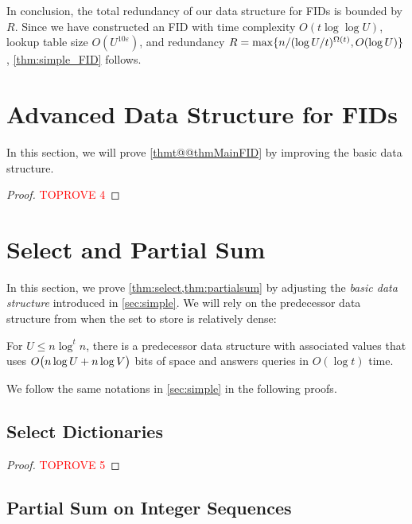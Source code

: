 \documentclass{article}
\theoremstyle{plain}
\theoremstyle{definition}  \newtheorem{definition}[theorem]{Definition}
\DeclarePairedDelimiter{\bk}{(}{)}
\DeclarePairedDelimiter{\BK}{\{}{\}}
\newcommand{\eps}{\varepsilon}
\begin{document}
\smallskip

In conclusion, the total redundancy of our data structure for FIDs is bounded by $R$. Since we have constructed an FID with time complexity $O(t\log \log U)$, lookup table size $O(U^{10 \eps})$, and redundancy $R = \max \BK{n/(\log U/t)^{\Omega(t)}, O(\log U)}$, \cref{thm:simple_FID} follows.
 
\section{Advanced Data Structure for FIDs}
\label{sec:advanced}

In this section, we will prove \cref{thmt@@thmMainFID} by improving the basic data structure. 
\thmMainFID*

\begin{proof}\textcolor{red}{TOPROVE 4}\end{proof}
 
\section{Select and Partial Sum}
\label{sec:select}

In this section, we prove \cref{thm:select,thm:partialsum} by adjusting the \emph{basic data structure} introduced in \cref{sec:simple}. We will rely on the predecessor data structure from \cite{patrascu2006timespace} when the set to store is relatively dense:

\begin{lemma}
  \label{lm:pred-dense}
  For $U \le n \log^{t} n$, there is a predecessor data structure with associated values that uses $O\bk[\big]{n \log U + n \log V}$ bits of space and answers queries in $O(\log t)$ time.
\end{lemma}

We follow the same notations in \cref{sec:simple} in the following proofs.

\subsection{Select Dictionaries}

\thmSelect*

\begin{proof}\textcolor{red}{TOPROVE 5}\end{proof}

\subsection{Partial Sum on Integer Sequences}
\end{document}
